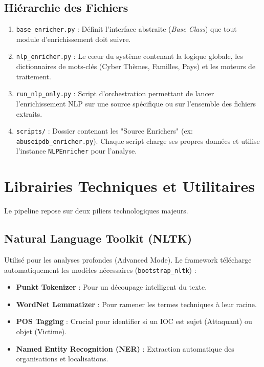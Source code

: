 \documentclass[12pt,a4paper]{article}
\begin{document}
\subsection{Hiérarchie des Fichiers}
\begin{enumerate}
    \item \texttt{base\_enricher.py} : Définit l'interface abstraite (\textit{Base Class}) que tout module d'enrichissement doit suivre.
    \item \texttt{nlp\_enricher.py} : Le cœur du système contenant la logique globale, les dictionnaires de mots-clés (Cyber Thèmes, Familles, Pays) et les moteurs de traitement.
    \item \texttt{run\_nlp\_only.py} : Script d'orchestration permettant de lancer l'enrichissement NLP sur une source spécifique ou sur l'ensemble des fichiers extraits.
    \item \texttt{scripts/} : Dossier contenant les "Source Enrichers" (ex: \texttt{abuseipdb\_enricher.py}). Chaque script charge ses propres données et utilise l'instance \texttt{NLPEnricher} pour l'analyse.
\end{enumerate}

\section{Librairies Techniques et Utilitaires}
Le pipeline repose sur deux piliers technologiques majeurs.

\subsection{Natural Language Toolkit (NLTK)}
Utilisé pour les analyses profondes (Advanced Mode). Le framework télécharge automatiquement les modèles nécessaires (\texttt{bootstrap\_nltk}) :
\begin{itemize}
    \item \textbf{Punkt Tokenizer} : Pour un découpage intelligent du texte.
    \item \textbf{WordNet Lemmatizer} : Pour ramener les termes techniques à leur racine.
    \item \textbf{POS Tagging} : Crucial pour identifier si un IOC est sujet (Attaquant) ou objet (Victime).
    \item \textbf{Named Entity Recognition (NER)} : Extraction automatique des organisations et localisations.
\end{itemize}
\end{document}
